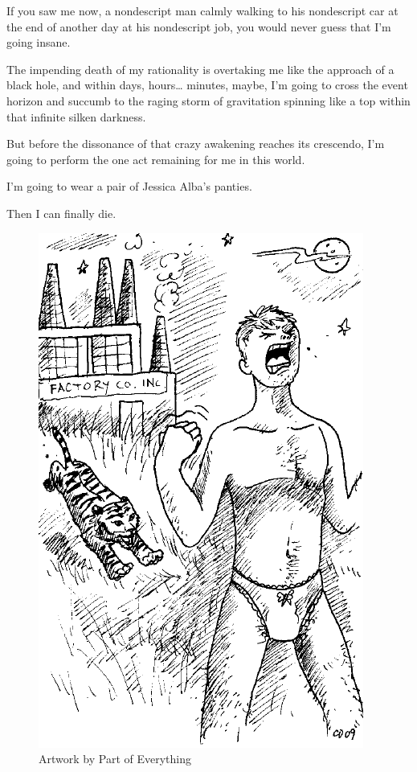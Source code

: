 If you saw me now, a nondescript man calmly walking to his
nondescript car at the end of another day at his nondescript job,
you would never guess that I'm going insane.



The impending death of my rationality is overtaking me like the
approach of a black hole, and within days, hours{\ldots} minutes,
maybe, I'm going to cross the event horizon and succumb to
the raging storm of gravitation spinning like a top within that
infinite silken darkness.



But before the dissonance of that crazy awakening rea\-ches its
crescendo, I'm going to perform the one act remaining for me
in this world.



I'm going to wear a pair of Jessica Alba's
panties.



Then I can finally die. 
 



\begin{figure}[b]
  \includegraphics[width=\textwidth]{art/Part_of_Everything-Scream_in_Panties.png}
  \caption{Artwork by Part of Everything}
\end{figure}
